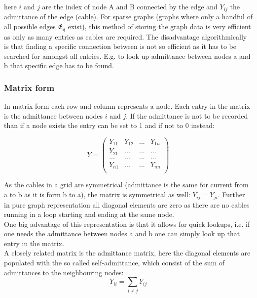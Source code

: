 here $i$ and $j$ are the index of node A and B connected by the edge and
$Y_{ij}$ the admittance of the edge (cable).
For sparse graphs (graphs where only a handful of all possible edges $\mathfrak{E_{ij}}$ exist), this method
of storing the graph data is very efficient as only as many entries as cables are required. The disadvantage
algorithmically is that finding a specific connection between is not so efficient as it has to be searched for amongst
all entries. E.g. to look up admittance between nodes a and b that specific edge has to be found.

\subsubsection{Matrix form}

In matrix form each row and column represents a node. Each entry in the matrix is the admittance between nodes $i$ and $j$.
If the admittance is not to be recorded than if a node exists the entry can be set to 1 and if not to 0 instead:

\begin{equation}
    Y =
    \begin{pmatrix}
        Y_{11} & Y_{12} & ... & Y_{1n}\\
        Y_{21} & ...    & ... & ...   \\
        ...    & ...    & ... & ...   \\
        Y_{n1} & ...    & ... & Y_{nn}\\
    \end{pmatrix}
\end{equation}

As the cables in a grid are symmetrical (admittance is the same for current from a to b as it is form b to a), 
the matrix is symmetrical as well: $Y_{ij} = Y_{ji}$. Further in pure graph representation all diagonal elements are
zero as there are no cables running in a loop starting and ending at the same node.\\ 
One big advantage of this representation is that it allows for quick lookups, i.e. if one needs the admittance between nodes a and b
one can simply look up that entry in the matrix.\\
A closely related matrix is the admittance matrix, here the diagonal elements are populated with the
so called self-admittance, which consist of the sum of admittances to the neighbouring nodes:
\begin{equation}
    Y_{ii} = \sum_{i \ne j} Y_{ij}
\end{equation}

